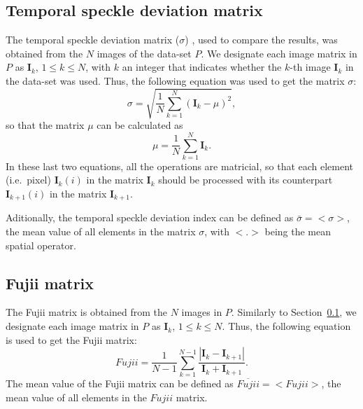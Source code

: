 \documentclass[review]{elsarticle}
\begin{document}
\subsection{Temporal speckle deviation matrix}
\label{subsec:deviation}
The temporal speckle deviation matrix ($\sigma$) \cite{Nothdurft:05},
used to compare the results, was obtained from the $N$ images of the data-set $P$.
We designate each image matrix in $P$ as $\mathbf{I}_{k}$, $1\leq k \leq N$, 
with $k$ an integer that indicates whether the $k$-th image $\mathbf{I}_{k}$ in the data-set was used.
Thus, the following equation was used to get
the matrix $\sigma$:
\begin{equation}\label{eq:cont2}
\sigma  = \sqrt{ \frac{1}{N} \sum_{k=1}^{N} (\mathbf{I}_{k}-\mu)^2  },
\end{equation}
so that the matrix $\mu$ can be calculated as
\begin{equation}\label{eq:cont1}
\mu =  \frac{1}{N} \sum_{k=1}^{N} \mathbf{I}_{k}.
\end{equation}
In these last two equations, all the operations are matricial, 
so that each element (i.e.\ pixel) $\mathbf{I}_{k}(i)$ in the matrix $\mathbf{I}_{k}$
should be processed with its  counterpart $\mathbf{I}_{k+1}(i)$ in the matrix $\mathbf{I}_{k+1}$.


Aditionally, the temporal speckle deviation index can be defined as $\bar{\sigma}=<\sigma>$, the mean value
of all elements in the matrix $\sigma$, with $<.>$ being the mean spatial operator.


\subsection{Fujii matrix}
\label{subsec:fujii}

The Fujii matrix \cite{Fujii:87} is obtained from the $N$ images in $P$.
Similarly to Section~\ref{subsec:deviation}, 
we designate each image matrix in $P$ as $\mathbf{I}_{k}$, $1\leq k \leq N$.
Thus, the following equation is used to get the Fujii matrix:
\begin{equation}\label{eq:contFujii2}
Fujii  = \frac{1}{N-1} \sum_{k=1}^{N-1} \frac{|\mathbf{I}_{k}-\mathbf{I}_{k+1}|}{\mathbf{I}_{k}+\mathbf{I}_{k+1}}.
\end{equation} 
The mean value of the Fujii matrix can be defined as $\overline{Fujii}=<Fujii>$, the mean value
of all elements in the $Fujii$ matrix.
\end{document}
